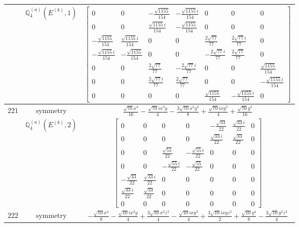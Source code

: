\documentclass[fleqn,8pt,landscape]{jsarticle}
\begin{document}
\begin{longtable}{ccc}
$  $ & $ \mathbb{Q}_{4}^{(a)}(E^{(b)},1) $ & $ \begin{bmatrix} 0 & 0 & - \frac{\sqrt{1155}}{154} & - \frac{\sqrt{1155} i}{154} & 0 & 0 & 0 \\ 0 & 0 & \frac{\sqrt{1155} i}{154} & - \frac{\sqrt{1155}}{154} & 0 & 0 & 0 \\ - \frac{\sqrt{1155}}{154} & \frac{\sqrt{1155} i}{154} & 0 & 0 & \frac{2 \sqrt{77}}{77} & \frac{2 \sqrt{77} i}{77} & 0 \\ - \frac{\sqrt{1155} i}{154} & - \frac{\sqrt{1155}}{154} & 0 & 0 & - \frac{2 \sqrt{77} i}{77} & \frac{2 \sqrt{77}}{77} & 0 \\ 0 & 0 & \frac{2 \sqrt{77}}{77} & - \frac{2 \sqrt{77} i}{77} & 0 & 0 & \frac{\sqrt{1155}}{154} \\ 0 & 0 & \frac{2 \sqrt{77} i}{77} & \frac{2 \sqrt{77}}{77} & 0 & 0 & - \frac{\sqrt{1155} i}{154} \\ 0 & 0 & 0 & 0 & \frac{\sqrt{1155}}{154} & - \frac{\sqrt{1155} i}{154} & 0 \end{bmatrix} $ \\ \hline
$ 221 $ & $ \text{symmetry} $ & $ \frac{\sqrt{70} x^{4}}{16} - \frac{\sqrt{70} i x^{3} y}{4} - \frac{3 \sqrt{70} x^{2} y^{2}}{8} + \frac{\sqrt{70} i x y^{3}}{4} + \frac{\sqrt{70} y^{4}}{16} $ \\
$  $ & $ \mathbb{Q}_{4}^{(a)}(E^{(b)},2) $ & $ \begin{bmatrix} 0 & 0 & 0 & 0 & - \frac{\sqrt{33}}{22} & \frac{\sqrt{33} i}{22} & 0 \\ 0 & 0 & 0 & 0 & \frac{\sqrt{33} i}{22} & \frac{\sqrt{33}}{22} & 0 \\ 0 & 0 & \frac{\sqrt{55}}{22} & - \frac{\sqrt{55} i}{22} & 0 & 0 & 0 \\ 0 & 0 & - \frac{\sqrt{55} i}{22} & - \frac{\sqrt{55}}{22} & 0 & 0 & 0 \\ - \frac{\sqrt{33}}{22} & \frac{\sqrt{33} i}{22} & 0 & 0 & 0 & 0 & 0 \\ \frac{\sqrt{33} i}{22} & \frac{\sqrt{33}}{22} & 0 & 0 & 0 & 0 & 0 \\ 0 & 0 & 0 & 0 & 0 & 0 & 0 \end{bmatrix} $ \\ \hline
$ 222 $ & $ \text{symmetry} $ & $ - \frac{\sqrt{10} x^{4}}{8} - \frac{\sqrt{10} i x^{3} y}{4} + \frac{3 \sqrt{10} x^{2} z^{2}}{4} - \frac{\sqrt{10} i x y^{3}}{4} + \frac{3 \sqrt{10} i x y z^{2}}{2} + \frac{\sqrt{10} y^{4}}{8} - \frac{3 \sqrt{10} y^{2} z^{2}}{4} $ \\

\end{longtable}
\end{document}
